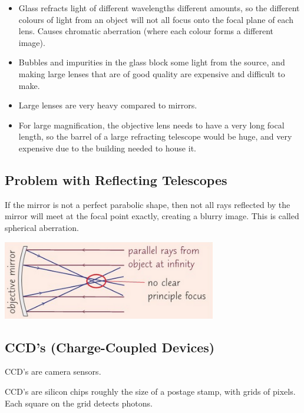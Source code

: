 \documentclass[a4paper, 12pt]{article}
\begin{document}
\begin{itemize}
	\item Glass refracts light of different wavelengths different amounts, so the different colours of light from an object will not all focus onto the focal plane of each lens. Causes chromatic aberration (where each colour forms a different image).

	\item Bubbles and impurities in the glass block some light from the source, and making large lenses that are of good quality are expensive and difficult to make.

	\item Large lenses are very heavy compared to mirrors.

	\item For large magnification, the objective lens needs to have a very long focal length, so the barrel of a large refracting telescope would be huge, and very expensive due to the building needed to house it.
\end{itemize}

\subsection{Problem with Reflecting Telescopes}

If the mirror is not a perfect parabolic shape, then not all rays reflected by the mirror will meet at the focal point exactly, creating a blurry image. This is called spherical aberration.

\begin{center}
\includegraphics[width=0.7\textwidth]{images/sphericalAbb.png}
\end{center}

\subsection{CCD's (Charge-Coupled Devices)}

CCD's are camera sensors.

CCD's are silicon chips roughly the size of a postage stamp, with grids of pixels. Each square on the grid detects photons.
\end{document}
